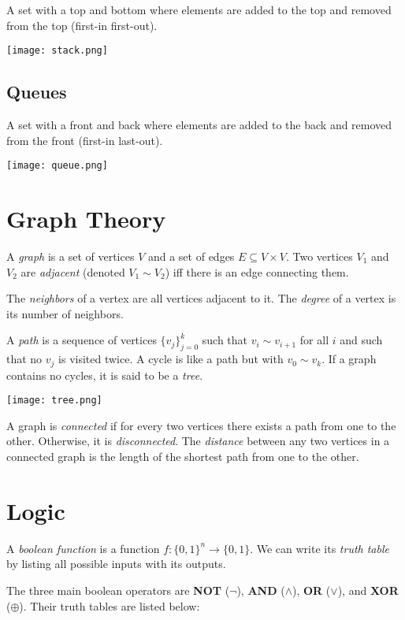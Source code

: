 \documentclass[10pt]{article}
\renewcommand{\bf}[1]{\textbf{#1}}
\newcommand{\header}[1]
{
\section*{#1}
}
\begin{document}
\begin{multicols}{3}
A set with a top and bottom where elements are added to the top and removed from the top (first-in first-out).

\begin{center}
\texttt{[image: stack.png]}
\end{center}

\vspace{-15pt}

\subsection*{Queues}

A set with a front and back where elements are added to the back and removed from the front (first-in last-out).

\begin{center}
\texttt{[image: queue.png]}
\end{center}

\header{Graph Theory}

A \textit{graph} is a set of vertices $V$ and a set of edges $E\subseteq V\times V$.  Two vertices $V_1$ and $V_2$ are \textit{adjacent} (denoted $V_1\sim V_2$) iff there is an edge connecting them.

The \textit{neighbors} of a vertex are all vertices adjacent to it.  The \textit{degree} of a vertex is its number of neighbors.

A \textit{path} is a sequence of vertices $\{v_j\}_{j=0}^k$ such that $v_i\sim v_{i+1}$ for all $i$ and such that no $v_j$ is visited twice.  A cycle is like a path but with $v_0\sim v_k$.  If a graph contains no cycles, it is said to be a \textit{tree}.

\begin{center}
\texttt{[image: tree.png]}
\end{center}

A graph is \textit{connected} if for every two vertices there exists a path from one to the other.  Otherwise, it is \textit{disconnected}.  The \textit{distance} between any two vertices in a connected graph is the length of the shortest path from one to the other.

\header{Logic}

A \textit{boolean function} is a function $f:\{0,1\}^n\to\{0,1\}$.  We can write its \textit{truth table} by listing all possible inputs with its outputs.

The three main boolean operators are \bf{NOT} ($\neg$), \bf{AND} ($\wedge$), \bf{OR} ($\vee$), and \bf{XOR} ($\oplus$).  Their truth tables are listed below:


\end{multicols}
\end{document}
